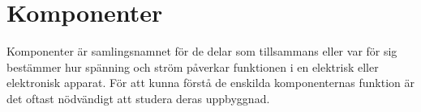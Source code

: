 \chapter{Komponenter}
\label{ch:komponenter}

Komponenter är samlingsnamnet för de delar som tillsammans eller var för sig
bestämmer hur spänning och ström påverkar funktionen i en elektrisk eller
elektronisk apparat.
För att kunna förstå de enskilda komponenternas funktion är det oftast
nödvändigt att studera deras uppbyggnad.
